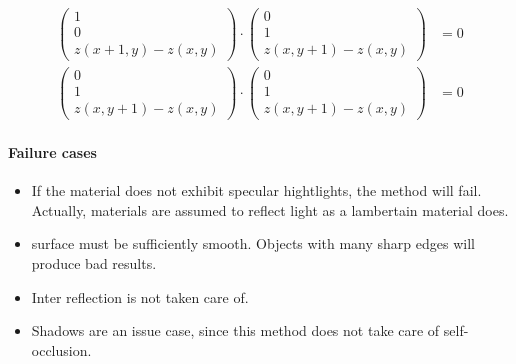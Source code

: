 \documentclass{paper}
\begin{document}
\begin{align}
    \left(
        \begin{array}{c}
            1 \\
            0 \\
            z(x+1,y)-z(x,y)
        \end{array}
    \right) 
    \cdot 
    \left(
        \begin{array}{c}
            0 \\
            1 \\
            z(x,y+1)-z(x,y)
        \end{array}
    \right) &= 0 \nonumber \\
        \left(
        \begin{array}{c}
            0 \\
            1 \\
            z(x,y+1)-z(x,y)
        \end{array}
    \right) 
    \cdot 
    \left(
        \begin{array}{c}
            0 \\
            1 \\
            z(x,y+1)-z(x,y)
        \end{array}
    \right) &= 0 
\label{eq:gen_constraint_tangents_ref1}
\end{align}


    
    


\paragraph{Failure cases}
\begin{itemize}
    \item If the material does not exhibit specular hightlights, the method will fail. Actually, materials are assumed to reflect light as a lambertain material does.
    \item surface must be sufficiently smooth. Objects with many sharp edges will produce bad results.
    \item Inter reflection is not taken care of.
    \item Shadows are an issue case, since this method does not take care of self-occlusion.
\end{itemize}
\end{document}
